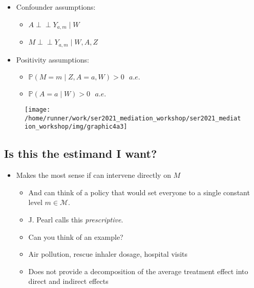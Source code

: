 \documentclass[
  12pt,
]{book}
\providecommand{\tightlist}{%
  \setlength{\itemsep}{0pt}\setlength{\parskip}{0pt}}
\theoremstyle{definition}
\theoremstyle{definition}
\theoremstyle{definition}
\newcommand{\indep}{\mbox{$\perp\!\!\!\perp$}}
\renewcommand{\P}{\mathbb{P}}
\newcommand{\1}{\mathbbm{1}}
\begin{document}
\begin{itemize}
\tightlist
\item
  Confounder assumptions:

  \begin{itemize}
  \tightlist
  \item
    \(A \indep Y_{a,m} \mid W\)
  \item
    \(M \indep Y_{a,m} \mid W, A, Z\)
  \end{itemize}
\item
  Positivity assumptions:

  \begin{itemize}
  \tightlist
  \item
    \(\P(M = m \mid Z, A=a, W) > 0 \text{  } a.e.\)
  \item
    \(\P(A=a \mid W) > 0 \text{  } a.e.\)
  \end{itemize}
\end{itemize}

\begin{figure}

{\centering \texttt{[image: /home/runner/work/ser2021\_mediation\_workshop/ser2021\_mediation\_workshop/img/graphic4a3]} 

}

\end{figure}

\hypertarget{is-this-the-estimand-i-want}{%
\subsection{Is this the estimand I want?}\label{is-this-the-estimand-i-want}}

\begin{itemize}
\tightlist
\item
  Makes the most sense if can intervene directly on \(M\)

  \begin{itemize}
  \tightlist
  \item
    And can think of a policy that would set everyone to a single constant
    level \(m \in \mathcal{M}\).
  \item
    J. Pearl calls this \emph{prescriptive}.
  \item
    Can you think of an example?
  \item
    Air pollution, rescue inhaler dosage, hospital visits
  \item
    Does not provide a decomposition of the average treatment effect into direct and indirect effects
  \end{itemize}
\end{itemize}
\end{document}
